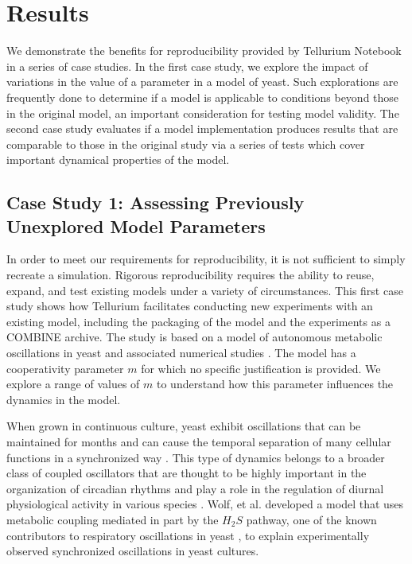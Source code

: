\documentclass[10pt,letterpaper]{article}
\begin{document}
\section*{Results}

We demonstrate the benefits for reproducibility provided by Tellurium Notebook in a series of case studies. In the first case study, we explore the impact of variations in the value of a parameter in a model of yeast. Such explorations are frequently done to determine if a model is applicable to conditions beyond those in the original model, an important consideration for testing model validity. The second case study evaluates if a model implementation produces results that are comparable to those in the original study via a series of tests which cover important dynamical properties of the model.

\subsection*{Case Study 1: Assessing Previously Unexplored Model Parameters}

In order to meet our requirements for reproducibility, it is not sufficient to simply recreate a simulation. Rigorous reproducibility requires the ability to reuse, expand, and test existing models under a variety of circumstances. This first case study shows how Tellurium facilitates conducting new experiments with an existing model, including the packaging of the model and the experiments as a COMBINE archive. The study is based on a model of autonomous metabolic oscillations in yeast and associated numerical studies \cite{wolf2001mathematical}. The model has a cooperativity parameter $m$ for which no specific justification is provided. We explore a range of values of $m$ to understand how this parameter influences the dynamics in the model.

When grown in continuous culture, yeast exhibit oscillations that can be maintained for months and can cause the temporal separation of many cellular functions in a synchronized way \cite{murray2007regulation}. This type of dynamics belongs to a broader class of coupled oscillators that are thought to be highly important in the organization of circadian rhythms and play a role in the regulation of diurnal physiological activity in various species \cite{winfree1967biological,dodd2005plant}.
Wolf, et al. \cite{wolf2001mathematical} developed a model that uses metabolic coupling mediated in part by the $H_2 S$ pathway, one of the known contributors to respiratory oscillations in yeast \cite{murray2007regulation}, to explain experimentally observed synchronized oscillations in yeast cultures.
\end{document}
